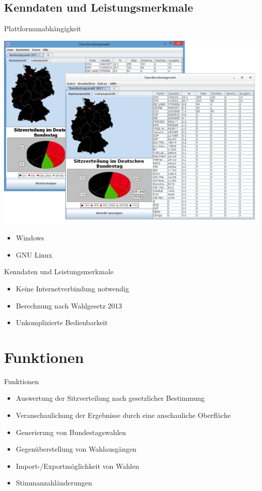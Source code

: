 \documentclass[18pt]{beamer}
\begin{document}
\subsection{Kenndaten und Leistungsmerkmale}
\begin{frame}{Plattformunabhängigkeit}
\begin{center}
	\includegraphics[scale=0.25]{img/app.png}
\end{center}
\begin{itemize}
	\item Windows
	\item GNU Linux
\end{itemize}
\end{frame}

\begin{frame}{Kenndaten und Leistungsmerkmale}
\begin{itemize}
	\item Keine Internetverbindung notwendig
	\item Berechnung nach Wahlgesetz 2013
	\item Unkomplizierte Bedienbarkeit
\end{itemize}
\end{frame}


\section{Funktionen}
\begin{frame}{Funktionen}
\begin{itemize}
	\item Auswertung der Sitzverteilung nach gesetzlicher Bestimmung
	\item Veranschaulichung der Ergebnisse durch eine anschauliche Oberfläche
	\item Generierung von Bundestagswahlen
	\item Gegenüberstellung von Wahlausgängen
	\item Import-/Exportmöglichkeit von Wahlen
	\item Stimmanzahländerungen
\end{itemize}
\end{frame}
\end{document}
